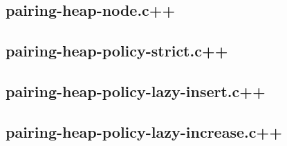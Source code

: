 \documentclass{DIKU-article}[2010/01/13]
\begin{document}
\subsection{pairing-heap-node.c++}


\subsection{pairing-heap-policy-strict.c++}


\subsection{pairing-heap-policy-lazy-insert.c++}


\subsection{pairing-heap-policy-lazy-increase.c++}

\end{document}
